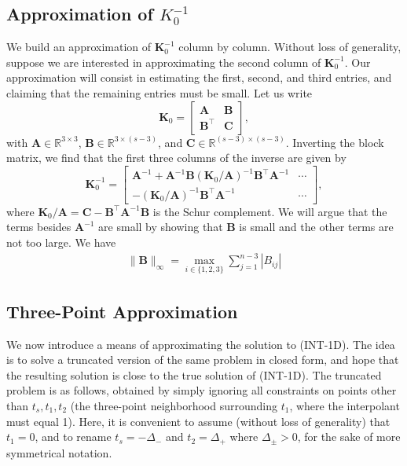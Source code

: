 \documentclass[11pt]{article}
\newcommand{\RR}{\mathbb{R}}
\newcommand{\bA}{\bm A}
\newcommand{\bB}{\bm B}
\newcommand{\bC}{\bm C}
\newcommand{\bK}{\bm K}
\begin{document}
\subsection{Approximation of $K_0^{-1}$}
We build an approximation of $\bK_0^{-1}$ column by column.
Without loss of generality, suppose we are interested in approximating the second column of $\bK_0^{-1}$.
Our approximation will consist in estimating the first, second, and third entries, and claiming that the remaining entries must be small.
Let us write
\begin{equation}
    \bK_0 = \left[ \begin{array}{cc} \bA & \bB \\ \bB^\top & \bC \end{array} \right],
\end{equation}
with $\bA \in \RR^{3 \times 3}$, $\bB \in \RR^{3 \times (s - 3)}$, and $\bC \in \RR^{(s - 3) \times (s - 3)}$.
Inverting the block matrix, we find that the first three columns of the inverse are given by
\begin{equation}
    \bK_0^{-1} = \left[ \begin{array}{cc} \bA^{-1} + \bA^{-1}\bB(\bK_0 / \bA)^{-1}\bB^\top \bA^{-1} & \cdots \\ -(\bK_0 / \bA)^{-1}\bB^\top \bA^{-1} & \cdots \end{array} \right],
\end{equation}
where $\bK_0 / \bA = \bC - \bB^\top \bA^{-1} \bB$ is the Schur complement.
We will argue that the terms besides $\bA^{-1}$ are small by showing that $\bB$ is small and the other terms are not too large.
We have
\begin{align}
  \|\bB\|_\infty = \max_{i \in \{1, 2, 3\}} \sum_{j = 1}^{n - 3} |B_{ij}|
\end{align}

\subsection{Three-Point Approximation}

We now introduce a means of approximating the solution to (INT-1D).
The idea is to solve a truncated version of the same problem in closed form, and hope that the resulting solution is close to the true solution of (INT-1D).
The truncated problem is as follows, obtained by simply ignoring all constraints on points other than $t_s, t_1, t_2$ (the three-point neighborhood surrounding $t_1$, where the interpolant must equal 1).
Here, it is convenient to assume (without loss of generality) that $t_1 = 0$, and to rename $t_s = -\Delta_-$ and $t_2 = \Delta_{+}$ where $\Delta_{\pm} > 0$, for the sake of more symmetrical notation.
\end{document}
